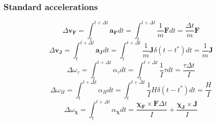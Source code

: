 \documentclass[10pt]{report}
\begin{document}
\subsubsection{Standard accelerations}
\begin{equation}\Delta\boldsymbol{v}_{\boldsymbol{F}}=\int_t^{t+\Delta t}\boldsymbol{a}_{\boldsymbol{F}}dt=\int_t^{t+\Delta t}\frac{1}{m}\boldsymbol{F}dt=\frac{\Delta t}{m}\boldsymbol{F}\end{equation}
\begin{equation}\Delta\boldsymbol{v}_{\boldsymbol{J}}=\int_t^{t+\Delta t}\boldsymbol{a}_{\boldsymbol{J}}dt=\int_t^{t+\Delta t}\frac{1}{m}\boldsymbol{J}\delta(t-t^*)dt=\frac{1}{m}\boldsymbol{J}\end{equation}
\begin{equation}\Delta\omega_\tau=\int_t^{t+\Delta t}\alpha_\tau dt=\int_t^{t+\Delta t}\frac{1}{I}\tau dt=\frac{\tau\Delta t}{I}\end{equation}
\begin{equation}\Delta\omega_H=\int_t^{t+\Delta t}\alpha_Hdt=\int_t^{t+\Delta t}\frac{1}{I}H\delta(t-t^*)dt=\frac{H}{I}\end{equation}
\begin{equation}\Delta\omega_{\boldsymbol{\chi}}=\int_t^{t+\Delta t}\alpha_{\boldsymbol{\chi}}dt=\frac{\boldsymbol{\chi_{\boldsymbol{F}}}\times{\boldsymbol{F}}\Delta t}{I}+\frac{\boldsymbol{\chi_{\boldsymbol{J}}}\times{\boldsymbol{J}}}{I}\end{equation}
\end{document}
